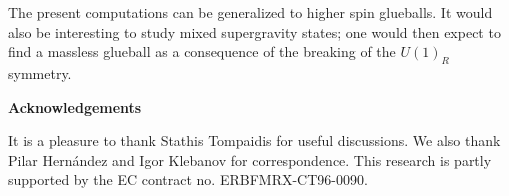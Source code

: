 \documentclass[12pt,epsf,a4paper]{article}
\begin{document}
The present computations can be generalized to higher spin 
glueballs. It would also be interesting to study mixed supergravity 
states; one would then expect to find a massless glueball as a consequence of the 
breaking of the $U(1)_R$ symmetry.



   
\vspace{8 mm}
  

{\bf Acknowledgements}

It is a pleasure to thank Stathis Tompaidis for useful discussions. We also 
thank Pilar Hern\'andez and Igor Klebanov for correspondence. This research is 
partly supported by the EC contract no. ERBFMRX-CT96-0090.

\newpage


\end{document}
